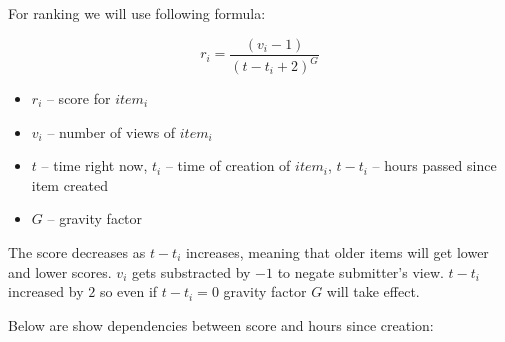 \documentclass{article}
\begin{document}
For ranking we will use following formula:

$$r_i = \frac{(v_i - 1)}{(t - t_i + 2)^G}$$


\begin{itemize}
    \item $r_i$ -- score for $item_i$
    \item $v_i$ -- number of views of $item_i$
    \item $t$ -- time right now, $t_i$ -- time of creation of $item_i$, $t - t_i$ -- hours passed since item created
    \item $G$ -- gravity factor
\end{itemize}

The score decreases as $t - t_i$ increases, meaning that older items will get lower and lower scores. $v_i$ gets substracted by $-1$ to negate submitter's view. $t - t_i$ increased by $2$ so even if $t - t_i = 0$ gravity factor $G$ will take effect.


Below are show dependencies between score and hours since creation:
\end{document}
